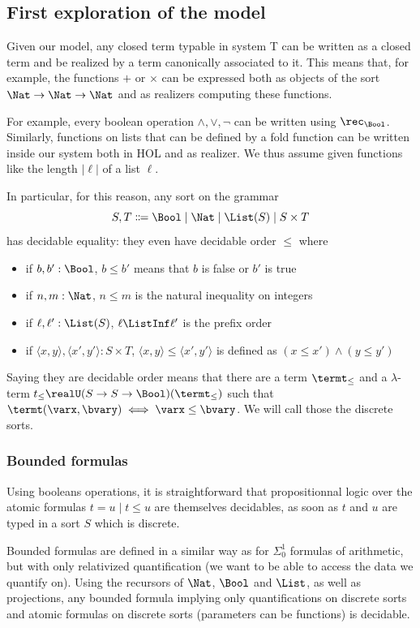 \subsection{First exploration of the model}

Given our model, any closed term typable in system T can be written as a closed term and be realized by a term canonically associated to it. This means that, for example, the functions $+$ or $\times$ can be expressed both as objects of the sort $\Nat \to \Nat \to \Nat$ and as realizers computing these functions.

For example, every boolean operation $\land,\lor,\lnot$ can be written using $\rec_{\Bool}$. Similarly, functions on lists that can be defined by a fold function can be written inside our system both in HOL and as realizer. We thus assume given functions like the length $|\ell|$ of a list $\ell$.

In particular, for this reason, any sort on the grammar
\[S,T\Coloneq \Bool\mid\Nat\mid\List(S)\mid S\times T\]
has decidable equality: they even have decidable order $\leq$ where
\begin{itemize}
\item if $b,b' : \Bool$, $b \leq b'$ means that $b$ is false or $b'$ is true
\item if $n,m : \Nat$, $n \leq m$ is the natural inequality on integers
\item if $\ell,\ell' : \List(S)$, $\ell \ListInf \ell'$ is the prefix order
\item if $\langle x,y\rangle,\langle x',y'\rangle : S \times T$, $\langle x,y\rangle \leq \langle x',y'\rangle$ is defined as $(x \leq x') \land (y\leq y')$
\end{itemize}
Saying they are decidable order means that there are a term $\termt_{\leq}$ and a $\lambda$-term $t_{\leq} \realU (S\to S \to \Bool)(\termt_{\leq})$ such that $\termt(\varx,\bvary) \iff \varx \leq \bvary$.
We will call those the discrete sorts.

\subsubsection{Bounded formulas}

Using booleans operations, it is straightforward that propositionnal logic over the atomic formulas
$t = u \mid t \leq u$
are themselves decidables, as soon as $t$ and $u$ are typed in a sort $S$ which is discrete.

Bounded formulas are defined in a similar way as for $\Sigma_0^1$ formulas of arithmetic, but with only relativized quantification (we want to be able to access the data we quantify on).  Using the recursors of $\Nat$, $\Bool$ and $\List$, as well as projections, any bounded formula implying only quantifications on discrete sorts and atomic formulas on discrete sorts (parameters can be functions) is decidable.

